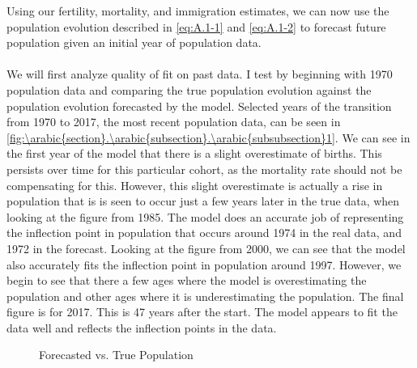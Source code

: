 \documentclass[10pt]{article}
\renewcommand{\thesection}{\arabic{section}}
\renewcommand{\thesubsection}{\thesection.\arabic{subsection}}
\renewcommand{\thesubsubsection}{\thesubsection.\arabic{subsubsection}}
\numberwithin{equation}{subsection}
\renewcommand{\subsubsection}[2][]{\oldsubsubsection[#1]{#2}\index{#1}\label{sec:\thesubsubsection}}
\newcommand*{\FigureDir}{../../graphs}
\begin{document}
\begin{appendices}

\subsubsection{Population}

Using our fertility, mortality, and immigration estimates, we can now use the population evolution described in \ref{eq:A.1-1} and \ref{eq:A.1-2} to forecast future population given an initial year of population data.
\\\\
We will first analyze quality of fit on past data. I test by beginning with 1970 population data and comparing the true population evolution against the population evolution forecasted by the model. Selected years of the transition from 1970 to 2017, the most recent population data, can be seen in \autoref{fig:\thesubsubsection1}. We can see in the first year of the model that there is a slight overestimate of births. This persists over time for this particular cohort, as the mortality rate should not be compensating for this. However, this slight overestimate is actually a rise in population that is is seen to occur just a few years later in the true data, when looking at the figure from 1985. The model does an accurate job of representing the inflection point in population that occurs around 1974 in the real data, and 1972 in the forecast. Looking at the figure from 2000, we can see that the model also accurately fits the inflection point in population around 1997. However, we begin to see that there a few ages where the model is overestimating the population and other ages where it is underestimating the population. The final figure is for 2017. This is 47 years after the start. The model appears to fit the data well and reflects the inflection points in the data. 

\begin{figure}[H]
   \centering
   \caption{\label{fig:\thesubsubsection1}Forecasted vs. True Population}
\end{figure}


\end{appendices}
\end{document}
